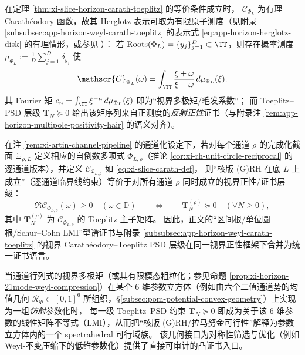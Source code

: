 \begin{remark}[有限维情形的视界谱测度与反射正性]\label{rem:xi-slice-horizon-measure-reflection-positivity}
在定理 \ref{thm:xi-slice-horizon-carath-toeplitz} 的等价条件成立时，
\(\mathscr{C}_{\Phi_L}\) 为有理 Carath\'eodory 函数，故其 Herglotz 表示可取为有限原子测度（见附录 \ref{subsubsec:app-horizon-weyl-carath-toeplitz} 的表示式 \eqref{eq:app-horizon-herglotz-disk} 的有理情形，或参见 \cite{Simon2005OPUC1}）：
若 \(\mathrm{Roots}(\Phi_L)=\{y_j\}_{j=1}^{D}\subset\TT\)，则存在概率测度
\(
\mu_{\Phi_L}:=\frac{1}{D}\sum_{j=1}^{D}\delta_{y_j}
\)
使
\[
\mathscr{C}_{\Phi_L}(\omega)=\int_{\TT}\frac{\xi+\omega}{\xi-\omega}\,d\mu_{\Phi_L}(\xi).
\]
其 Fourier 矩 \(c_n=\int_{\TT}\xi^{-n}\,d\mu_{\Phi_L}(\xi)\) 即为“视界多极矩/毛发系数”；
而 Toeplitz--PSD 层级 \(\mathbf{T}_N\succeq 0\) 给出该矩序列来自正测度的\emph{反射正性}证书（与附录注 \ref{rem:app-horizon-multipole-positivity-hair} 的语义对齐）。
\end{remark}

\begin{corollary}\label{cor:xi-channel-horizon-toeplitz-certificate}
在注 \ref{rem:xi-artin-channel-pipeline} 的通道化设定下，若对每个通道 \(\rho\) 的完成化截面 \(\Xi_{\rho,L}\) 定义相应的自倒数多项式 \(\Phi_{L,\rho}\)（推论 \ref{cor:xi-rh-unit-circle-reciprocal} 的逐通道版本），并定义 \(\mathscr{C}_{\Phi_{L,\rho}}\) 如 \eqref{eq:xi-slice-carath-def}，
则“核版 (G)RH 在底 \(L\) 上成立”（逐通道临界线约束）等价于对所有通道 \(\rho\) 同时成立的视界正性/证书层级：
\[
\Re\mathscr{C}_{\Phi_{L,\rho}}(\omega)\ge 0\quad(\omega\in\mathbb{D})
\qquad\Longleftrightarrow\qquad
\mathbf{T}^{(\rho)}_N\succeq 0\quad(\forall N\ge 0),
\]
其中 \(\mathbf{T}^{(\rho)}_N\) 为 \(\mathscr{C}_{\Phi_{L,\rho}}\) 的 Toeplitz 主子矩阵。
因此，正文的“区间根/单位圆根/Schur--Cohn LMI”型谱证书与附录 \ref{subsubsec:app-horizon-weyl-carath-toeplitz} 的视界 Carath\'eodory--Toeplitz PSD 层级在同一视界正性框架下合并为统一证书语言。
\end{corollary}

\begin{remark}\label{rem:xi-6d-parameter-spectrahedral-feasible}
当通道行列式的视界多极矩（或其有限模态粗粒化；参见命题 \ref{prop:xi-horizon-21mode-weyl-compression}）在某个 \(6\) 维参数立方体（例如由六个二值通道势的均值几何 \(\mathcal{R}_{\boldsymbol{\varphi}}\subset[0,1]^6\) 所组织，\S\ref{subsec:pom-potential-convex-geometry}）上实现为一组\emph{仿射}参数化时，
每一级 Toeplitz--PSD 约束 \(\mathbf{T}_N\succeq 0\) 即成为关于该 \(6\) 维参数的线性矩阵不等式（LMI），从而把“核版 (G)RH/拉马努金可行性”解释为参数立方体内的一个 spectrahedral 可行域族。
该几何接口为对称性筛选与优化（例如 Weyl-不变压缩下的低维参数化）提供了直接可审计的凸证书入口。
\end{remark}

